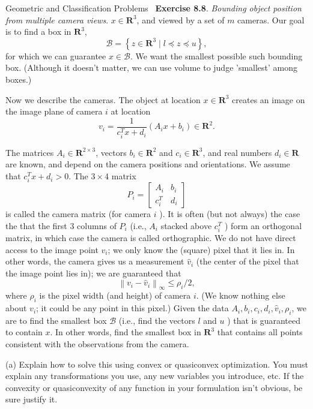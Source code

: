 \begin{chapter}{Geometric and Classification Problems}
    ~\cite{EE364a-extra}\textbf{Exercise 8.8}. \textit{Bounding object position from multiple camera views}.
$x \in \mathbf{R}^3$, and viewed by a set of $m$ cameras. Our goal is to find a box in $\mathbf{R}^3$,
\[
\mathcal{B}=\left\{z \in \mathbf{R}^3 \mid l \preceq z \preceq u\right\},
\]
for which we can guarantee $x \in \mathcal{B}$. We want the smallest possible such bounding box. (Although it doesn't matter, we can use volume to judge 'smallest' among boxes.)

\noindent Now we describe the cameras. The object at location $x \in \mathbf{R}^3$ creates an image on the image plane of camera $i$ at location
\[
v_i=\frac{1}{c_i^T x+d_i}\left(A_i x+b_i\right) \in \mathbf{R}^2 .
\]

\noindent The matrices $A_i \in \mathbf{R}^{2 \times 3}$, vectors $b_i \in \mathbf{R}^2$ and $c_i \in \mathbf{R}^3$, and real numbers $d_i \in \mathbf{R}$ are known, and depend on the camera positions and orientations. We assume that $c_i^T x+d_i>0$. The $3 \times 4$ matrix
\[
P_i=\left[\begin{array}{ll}
A_i & b_i \\
c_i^T & d_i
\end{array}\right]
\]
is called the camera matrix (for camera $i$ ). It is often (but not always) the case the that the first 3 columns of $P_i$ (i.e., $A_i$ stacked above $c_i^T$ ) form an orthogonal matrix, in which case the camera is called orthographic.
We do not have direct access to the image point $v_i$; we only know the (square) pixel that it lies in. In other words, the camera gives us a measurement $\hat{v}_i$ (the center of the pixel that the image point lies in); we are guaranteed that
\[
\left\|v_i-\hat{v}_i\right\|_{\infty} \leq \rho_i / 2,
\]
where $\rho_i$ is the pixel width (and height) of camera $i$. (We know nothing else about $v_i$; it could be any point in this pixel.)
Given the data $A_i, b_i, c_i, d_i, \hat{v}_i, \rho_i$, we are to find the smallest box $\mathcal{B}$ (i.e., find the vectors $l$ and $u$ ) that is guaranteed to contain $x$.
In other words, find the smallest box in $\mathbf{R}^3$ that contains all points consistent with the observations from the camera.

\vspace{0.1cm}
\noindent (a) Explain how to solve this using convex or quasiconvex optimization. You must explain any transformations you use, any new variables you introduce, etc.
If the convexity or quasiconvexity of any function in your formulation isn't obvious, be sure justify it.


\end{chapter}
